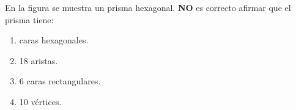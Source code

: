 \documentclass[fleqn]{article}
\begin{document}
\begin{enumerate}
\begin{minipage}{.45\textwidth}
\end{minipage}
\begin{minipage}{.45\textwidth}
\item En la figura se muestra un prisma hexagonal. \textbf{NO} es correcto afirmar que el prisma tiene:
\begin{enumerate}
\item caras hexagonales.
\item 18 aristas.
\item 6 caras rectangulares.
\item 10 vértices.
\end{enumerate}
\end{minipage}


\end{enumerate}
\end{document}

